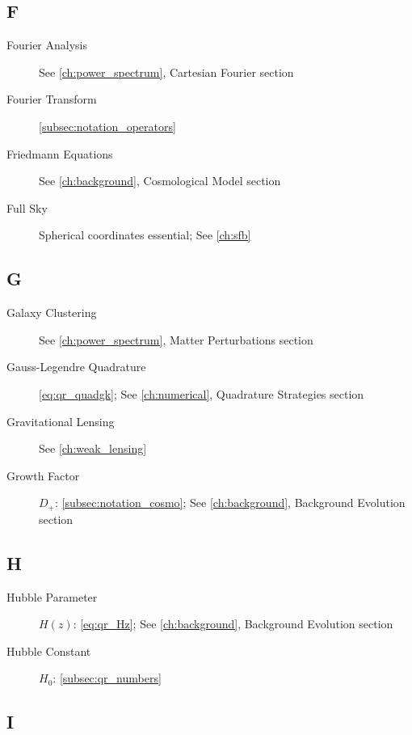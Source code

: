 \subsection{F}\label{subsec:idx_f}

\begin{description}
    \item[Fourier Analysis] See \cref{ch:power_spectrum}, Cartesian Fourier section
    \item[Fourier Transform] \autoref{subsec:notation_operators}
    \item[Friedmann Equations] See \cref{ch:background}, Cosmological Model section
    \item[Full Sky] Spherical coordinates essential; See \cref{ch:sfb}
\end{description}

\subsection{G}\label{subsec:idx_g}

\begin{description}
    \item[Galaxy Clustering] See \cref{ch:power_spectrum}, Matter Perturbations section
    \item[Gauss-Legendre Quadrature] \autoref{eq:qr_quadgk}; See \cref{ch:numerical}, Quadrature Strategies section
    \item[Gravitational Lensing] See \cref{ch:weak_lensing}
    \item[Growth Factor] $D_+$: \autoref{subsec:notation_cosmo}; See \cref{ch:background}, Background Evolution section
\end{description}

\subsection{H}\label{subsec:idx_h}

\begin{description}
    \item[Hubble Parameter] $H(z)$: \autoref{eq:qr_Hz}; See \cref{ch:background}, Background Evolution section
    \item[Hubble Constant] $H_0$: \autoref{subsec:qr_numbers}
\end{description}

\subsection{I}\label{subsec:idx_i}

